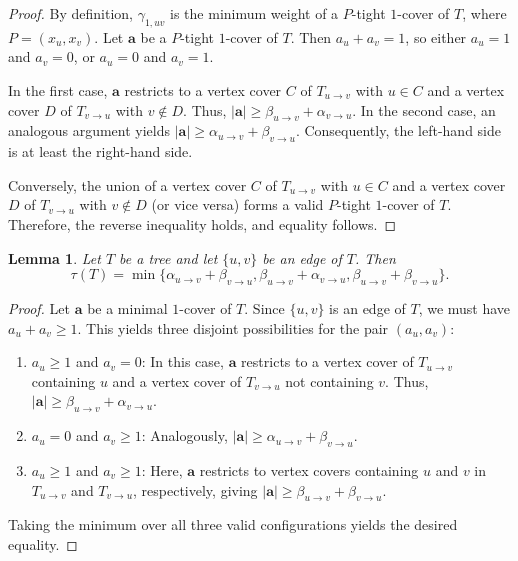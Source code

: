 \documentclass[12pt,amscd]{amsart}
\newtheorem{lem}[thm]{Lemma}
\theoremstyle{definition}
\numberwithin{equation}{section}
\begin{document}
\begin{proof} 
By definition, $\gamma_{1,uv}$ is the minimum weight of a $P$-tight $1$-cover of $T$, where $P = (x_u, x_v)$. Let $\mathbf{a}$ be a $P$-tight $1$-cover of $T$. Then $a_u + a_v = 1$, so either $a_u = 1$ and $a_v = 0$, or $a_u = 0$ and $a_v = 1$. 

In the first case, $\mathbf{a}$ restricts to a vertex cover $C$ of $T_{u \to v}$ with $u \in C$ and a vertex cover $D$ of $T_{v \to u}$ with $v \notin D$. Thus, $|\mathbf{a}| \ge \beta_{u \to v} + \alpha_{v \to u}$. In the second case, an analogous argument yields $|\mathbf{a}| \ge \alpha_{u \to v} + \beta_{v \to u}$. Consequently, the left-hand side is at least the right-hand side.

Conversely, the union of a vertex cover $C$ of $T_{u \to v}$ with $u \in C$ and a vertex cover $D$ of $T_{v \to u}$ with $v \notin D$ (or vice versa) forms a valid $P$-tight $1$-cover of $T$. Therefore, the reverse inequality holds, and equality follows.
\end{proof}

\begin{lem}\label{lem_6} 
Let $T$ be a tree and let $\{u,v\}$ be an edge of $T$. Then 
\[
\tau(T) = \min \{\alpha_{u \to v} + \beta_{v \to u}, \beta_{u \to v} + \alpha_{v \to u}, \beta_{u \to v} + \beta_{v \to u}\}.
\]
\end{lem}

\begin{proof} 
Let $\mathbf{a}$ be a minimal $1$-cover of $T$. Since $\{u,v\}$ is an edge of $T$, we must have $a_u + a_v \ge 1$. This yields three disjoint possibilities for the pair $(a_u, a_v)$:
\begin{enumerate}
    \item $a_u \ge 1$ and $a_v = 0$: In this case, $\mathbf{a}$ restricts to a vertex cover of $T_{u \to v}$ containing $u$ and a vertex cover of $T_{v \to u}$ not containing $v$. Thus, $|\mathbf{a}| \ge \beta_{u \to v} + \alpha_{v \to u}$.
    \item $a_u = 0$ and $a_v \ge 1$: Analogously, $|\mathbf{a}| \ge \alpha_{u \to v} + \beta_{v \to u}$.
    \item $a_u \ge 1$ and $a_v \ge 1$: Here, $\mathbf{a}$ restricts to vertex covers containing $u$ and $v$ in $T_{u \to v}$ and $T_{v \to u}$, respectively, giving $|\mathbf{a}| \ge \beta_{u \to v} + \beta_{v \to u}$.
\end{enumerate}
Taking the minimum over all three valid configurations yields the desired equality.
\end{proof}
\end{document}
